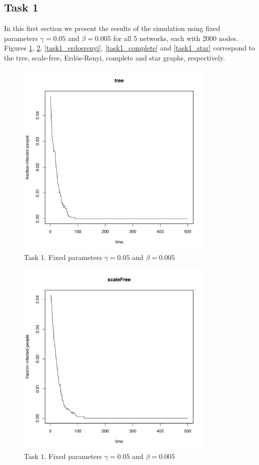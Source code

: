 \documentclass[paper=a4, fontsize=11pt]{scrartcl} %
\begin{document}
\subsection{Task 1}
In this first section we present the results of the simulation using fixed parameters $\gamma=0.05$ and $\beta=0.005$ for all 5 networks, each with 2000 nodes.  Figures \ref{task1_tree}, \ref{task1_scaleFree}, \ref{task1_erdosrenyi}, \ref{task1_complete} and \ref{task1_star} correspond to the tree, scale-free, Erdös-Renyi, complete and star graphs, respectively.
\begin{figure}[h] %
   \centering
   \includegraphics[width=0.85\textwidth]{task1_tree} 
   \caption{Task 1. Fixed parameters $\gamma=0.05$ and $\beta=0.005$}
   \label{task1_tree}
\end{figure}
\begin{figure}[h] %
   \centering
   \includegraphics[width=0.85\textwidth]{task1_scaleFree}
\caption{Task 1. Fixed parameters $\gamma=0.05$ and $\beta=0.005$} 
\label{task1_scaleFree}
\end{figure}
\end{document}
